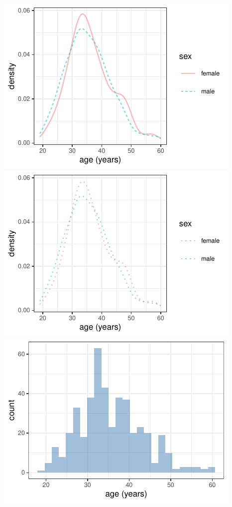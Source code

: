 \documentclass[twoside]{book}\usepackage[]{graphicx}\usepackage[]{xcolor}
\makeatletter
\def\maxwidth{ %
  \ifdim\Gin@nat@width>\linewidth
    \linewidth
  \else
    \Gin@nat@width
  \fi
}
\newenvironment{knitrout}{}{} %
\makeatother
\begin{document}
\begin{knitrout}
{\centering \includegraphics[width=\maxwidth]{figures/fig-pch-lwd-lty-1} 
\includegraphics[width=\maxwidth]{figures/fig-pch-lwd-lty-2} 
\includegraphics[width=\maxwidth]{figures/fig-pch-lwd-lty-3} 

}



\end{knitrout}
\end{document}
